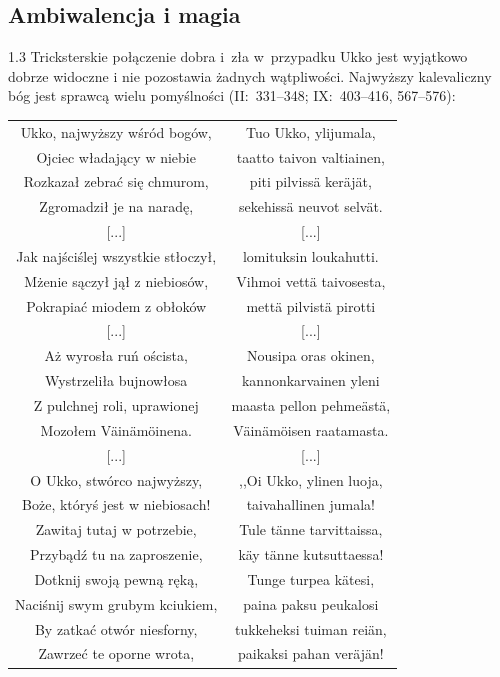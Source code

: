 \documentclass[11pt,a4paper,twoside]{report}
\begin{document}
\subsection*{Ambiwalencja i magia}
\begin{spacing}{1.3}
Tricksterskie połączenie dobra i~zła w~przypadku Ukko jest wyjątkowo dobrze widoczne i nie pozostawia żadnych wątpliwości. Najwyższy kalevaliczny bóg jest sprawcą wielu pomyślności (II:~331--348; IX:~403--416, 567--576):
\end{spacing}
{\centering
\small
\begin{longtable}{c c}
Ukko, najwyższy wśród bogów, & Tuo Ukko, ylijumala, \\
Ojciec władający w niebie & taatto taivon valtiainen, \\
Rozkazał zebrać się chmurom, & piti pilvissä keräjät, \\
Zgromadził je na naradę, & sekehissä neuvot selvät. \\
{[...]} & {[...]}\\
Jak najściślej wszystkie stłoczył, & lomituksin loukahutti. \\
Mżenie sączył jął z niebiosów, & Vihmoi vettä taivosesta,\\
Pokrapiać miodem z obłoków & mettä pilvistä pirotti\\
{[...]} & {[...]}\\
Aż wyrosła ruń oścista, & Nousipa oras okinen, \\
Wystrzeliła bujnowłosa & kannonkarvainen yleni \\
Z pulchnej roli, uprawionej & maasta pellon pehmeästä, \\
Mozołem Väinämöinena. & Väinämöisen raatamasta.\\
{[...]} & {[...]}\\
O Ukko, stwórco najwyższy, & ,,Oi Ukko, ylinen luoja, \\
Boże, któryś jest w niebiosach! & taivahallinen jumala! \\
Zawitaj tutaj w potrzebie, & Tule tänne tarvittaissa, \\
Przybądź tu na zaproszenie, & käy tänne kutsuttaessa! \\
Dotknij swoją pewną ręką, & Tunge turpea kätesi, \\
Naciśnij swym grubym kciukiem, & paina paksu peukalosi \\
By zatkać otwór niesforny, & tukkeheksi tuiman reiän, \\
Zawrzeć te oporne wrota, & paikaksi pahan veräjän! \\

\end{longtable}}
\end{document}
